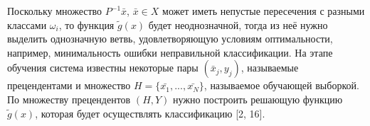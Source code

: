 Поскольку множество $P^{-1}\bar{x}$, $\bar{x} \in X$ может иметь непустые пересечения с разными классами $\omega_i$, то функция $\tilde{g}(x)$ будет неоднозначной, тогда из неё нужно выделить однозначную ветвь, удовлетворяющую условиям оптимальности, например, минимальность ошибки неправильной классификации. На этапе обучения система известны некоторые пары $(\bar{x}_j, y_j)$, называемые прецендентами и множество $H = \{\bar{x_1}, ...,\bar{x_N}\}$, называемое обучающей выборкой. По множеству прецендентов $(H, Y)$ нужно построить решающую функцию $\tilde{g}(x)$, которая будет осуществлять классификацию [2, 16].
